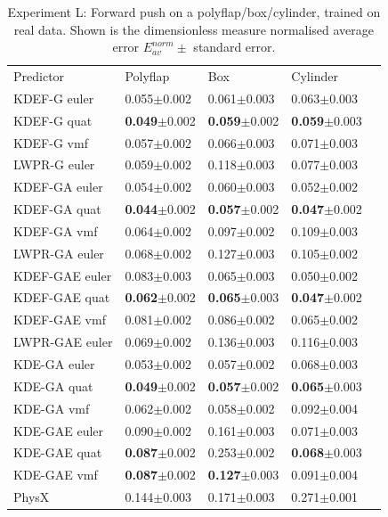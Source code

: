 \begin{table}[b]
\begin{center}
\begin{tabular}{|l|l|l|l|l|}
\cline{1-4}
Predictor & Polyflap & Box & Cylinder \\
\cline{1-4}
KDEF-G euler & 0.055$\pm$0.002 & 0.061$\pm$0.003 & 0.063$\pm$0.003\\
KDEF-G quat  & \textbf{0.049}$\pm$0.002 & \textbf{0.059}$\pm$0.002 & \textbf{0.059}$\pm$0.003\\
KDEF-G vmf   & 0.057$\pm$0.002 & 0.066$\pm$0.003 & 0.071$\pm$0.003\\
LWPR-G euler &  0.059$\pm$0.002 & 0.118$\pm$0.003 & 0.077$\pm$0.003\\
\cline{1-4}
KDEF-GA euler & 0.054$\pm$0.002 & 0.060$\pm$0.003 & 0.052$\pm$0.002\\
KDEF-GA quat & \textbf{0.044}$\pm$0.002 & \textbf{0.057}$\pm$0.002 & \textbf{0.047}$\pm$0.002\\
KDEF-GA vmf & 0.064$\pm$0.002 & 0.097$\pm$0.002  & 0.109$\pm$0.003 \\
LWPR-GA euler & 0.068$\pm$0.002 & 0.127$\pm$0.003 & 0.105$\pm$0.002 \\
\cline{1-4}
KDEF-GAE euler & 0.083$\pm$0.003 & 0.065$\pm$0.003 & 0.050$\pm$0.002 \\
KDEF-GAE quat & \textbf{0.062}$\pm$0.002 & \textbf{0.065}$\pm$0.003 & \textbf{0.047}$\pm$0.002\\
KDEF-GAE vmf & 0.081$\pm$0.002 & 0.086$\pm$0.002 & 0.065$\pm$0.002\\
LWPR-GAE euler & 0.069$\pm$0.002 & 0.136$\pm$0.003 & 0.116$\pm$0.003\\
\cline{1-4}
KDE-GA euler & 0.053$\pm$0.002 & 0.057$\pm$0.002 & 0.068$\pm$0.003 \\
KDE-GA quat  & \textbf{0.049}$\pm$0.002 & \textbf{0.057}$\pm$0.002 & \textbf{0.065}$\pm$0.003\\
KDE-GA vmf   & 0.062$\pm$0.002 & 0.058$\pm$0.002 & 0.092$\pm$0.004\\
\cline{1-4}
KDE-GAE euler & 0.090$\pm$0.002 & 0.161$\pm$0.003 & 0.071$\pm$0.003\\
KDE-GAE quat  & \textbf{0.087}$\pm$0.002 & 0.253$\pm$0.002 & \textbf{0.068}$\pm$0.003\\
KDE-GAE vmf   & \textbf{0.087}$\pm$0.002 & \textbf{0.127}$\pm$0.003 & 0.091$\pm$0.004\\
\cline{1-4}
PhysX & 0.144$\pm$0.003 &  0.171$\pm$0.003 & 0.271$\pm$0.001\\
\cline{1-4}
\end{tabular}
\end{center}
\caption[Performance Table]{Experiment L: Forward push on a
  polyflap/box/cylinder, trained on real data. Shown is the dimensionless measure normalised average error  ${E_{av}^{norm}} \pm$ standard error.
}\label{tab:PerformanceTableL1av}
\end{table}
